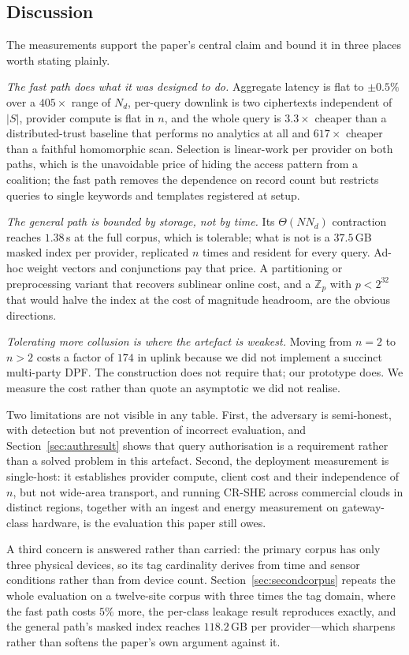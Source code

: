 \documentclass[journal]{IEEEtran}
\begin{document}
\subsection{Discussion}
The measurements support the paper's central claim and bound it in three places
worth stating plainly.

\emph{The fast path does what it was designed to do.} Aggregate latency is flat
to $\pm0.5\%$ over a $405\times$ range of $N_d$, per-query downlink is two
ciphertexts independent of $|S|$, provider compute is flat in $n$, and the whole
query is $3.3\times$ cheaper than a distributed-trust baseline that performs no
analytics at all and $617\times$ cheaper than a faithful homomorphic scan.
Selection is linear-work per provider on both paths, which is the unavoidable
price of hiding the access pattern from a coalition; the fast path removes the
dependence on record count but restricts queries to single keywords and
templates registered at setup.

\emph{The general path is bounded by storage, not by time.} Its $\Theta(N N_d)$
contraction reaches $1.38$\,s at the full corpus, which is tolerable; what is
not is a $37.5$\,GB masked index per provider, replicated $n$ times and resident
for every query. Ad-hoc weight vectors and conjunctions pay that price. A
partitioning or preprocessing variant that recovers sublinear online cost, and a
$\mathbb{Z}_p$ with $p<2^{32}$ that would halve the index at the cost of
magnitude headroom, are the obvious directions.

\emph{Tolerating more collusion is where the artefact is weakest.} Moving from
$n=2$ to $n>2$ costs a factor of $174$ in uplink because we did not implement a
succinct multi-party DPF. The construction does not require that; our prototype
does. We measure the cost rather than quote an asymptotic we did not realise.

Two limitations are not visible in any table. First, the adversary is
semi-honest, with detection but not prevention of incorrect evaluation, and
Section~\ref{sec:authresult} shows that query authorisation is a requirement
rather than a solved problem in this artefact. Second, the deployment
measurement is single-host: it establishes provider compute, client cost and
their independence of $n$, but not wide-area transport, and running CR-SHE
across commercial clouds in distinct regions, together with an ingest and energy
measurement on gateway-class hardware, is the evaluation this paper still owes.

A third concern is answered rather than carried: the primary corpus has only
three physical devices, so its tag cardinality derives from time and sensor
conditions rather than from device count. Section~\ref{sec:secondcorpus}
repeats the whole evaluation on a twelve-site corpus with three times the tag
domain, where the fast path costs $5\%$ more, the per-class leakage result
reproduces exactly, and the general path's masked index reaches $118.2$\,GB per
provider---which sharpens rather than softens the paper's own argument against
it.
\end{document}
